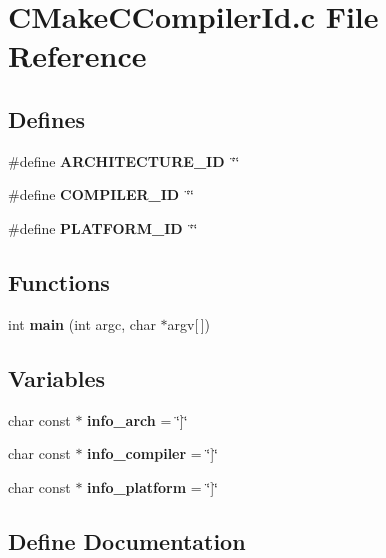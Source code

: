 \section{\-C\-Make\-C\-Compiler\-Id.\-c \-File \-Reference}
\label{CMakeCCompilerId_8c}
\subsection*{\-Defines}
\begin{DoxyCompactItemize}
\item 
\#define {\bf \-A\-R\-C\-H\-I\-T\-E\-C\-T\-U\-R\-E\-\_\-\-I\-D}~\char`\"{}\char`\"{}
\item 
\#define {\bf \-C\-O\-M\-P\-I\-L\-E\-R\-\_\-\-I\-D}~\char`\"{}\char`\"{}
\item 
\#define {\bf \-P\-L\-A\-T\-F\-O\-R\-M\-\_\-\-I\-D}~\char`\"{}\char`\"{}
\end{DoxyCompactItemize}
\subsection*{\-Functions}
\begin{DoxyCompactItemize}
\item 
int {\bf main} (int argc, char $\ast$argv[$\,$])
\end{DoxyCompactItemize}
\subsection*{\-Variables}
\begin{DoxyCompactItemize}
\item 
char const $\ast$ {\bf info\-\_\-arch} = \char`\"{}]\char`\"{}
\item 
char const $\ast$ {\bf info\-\_\-compiler} = \char`\"{}]\char`\"{}
\item 
char const $\ast$ {\bf info\-\_\-platform} = \char`\"{}]\char`\"{}
\end{DoxyCompactItemize}


\subsection{\-Define \-Documentation}
